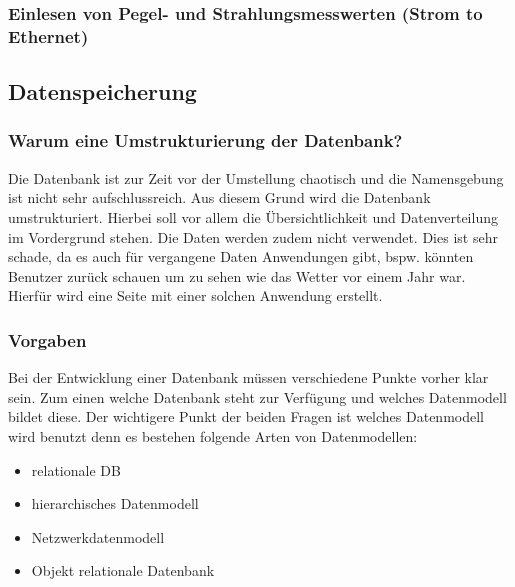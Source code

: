 \subsubsection{Einlesen von Pegel- und Strahlungsmesswerten (Strom to Ethernet)}
\newline
{}\newline




\subsection{Datenspeicherung}
\subsubsection{Warum eine Umstrukturierung der Datenbank?}
Die Datenbank ist zur Zeit vor der Umstellung chaotisch und die Namensgebung ist nicht sehr aufschlussreich. Aus diesem Grund wird die Datenbank umstrukturiert. Hierbei soll vor allem die Übersichtlichkeit und Datenverteilung im Vordergrund stehen. Die Daten werden zudem nicht verwendet. Dies ist sehr schade, da es auch für vergangene Daten Anwendungen gibt, bspw. könnten Benutzer zurück schauen um zu sehen wie das Wetter vor einem Jahr war. Hierfür wird eine Seite mit einer solchen Anwendung erstellt.

\subsubsection{Vorgaben}
Bei der Entwicklung einer Datenbank müssen verschiedene Punkte vorher klar sein. Zum einen welche Datenbank steht zur Verfügung und welches Datenmodell bildet diese. Der wichtigere Punkt der beiden Fragen ist welches Datenmodell wird benutzt denn es bestehen folgende Arten von Datenmodellen:
\begin{itemize}
\item relationale DB
\item hierarchisches Datenmodell
\item Netzwerkdatenmodell
\item Objekt relationale Datenbank
\end{itemize}

